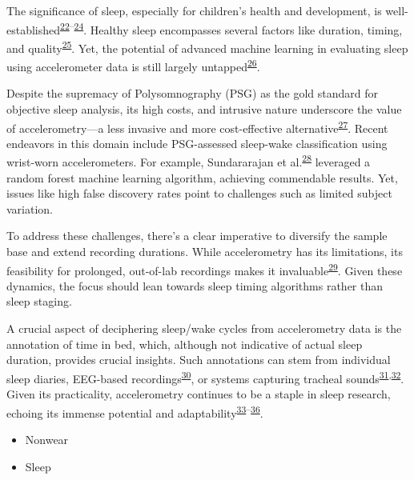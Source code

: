\documentclass[
  9pt,
]{article}
\providecommand{\tightlist}{%
  \setlength{\itemsep}{0pt}\setlength{\parskip}{0pt}}\usepackage{longtable,booktabs,array}
\begin{document}
The significance of sleep, especially for children's health and
development, is
well-established\textsuperscript{\protect\hyperlink{ref-chaput_systematic_2017}{22}--\protect\hyperlink{ref-st-onge_sleep_2016}{24}}.
Healthy sleep encompasses several factors like duration, timing, and
quality\textsuperscript{\protect\hyperlink{ref-gruber_position_2014}{25}}.
Yet, the potential of advanced machine learning in evaluating sleep
using accelerometer data is still largely
untapped\textsuperscript{\protect\hyperlink{ref-haghayegh_application_2020}{26}}.

Despite the supremacy of Polysomnography (PSG) as the gold standard for
objective sleep analysis, its high costs, and intrusive nature
underscore the value of accelerometry---a less invasive and more
cost-effective
alternative\textsuperscript{\protect\hyperlink{ref-vaughn_technical_2008}{27}}.
Recent endeavors in this domain include PSG-assessed sleep-wake
classification using wrist-worn accelerometers. For example,
Sundararajan et
al.\textsuperscript{\protect\hyperlink{ref-sundararajan_sleep_2021}{28}}
leveraged a random forest machine learning algorithm, achieving
commendable results. Yet, issues like high false discovery rates point
to challenges such as limited subject variation.

To address these challenges, there's a clear imperative to diversify the
sample base and extend recording durations. While accelerometry has its
limitations, its feasibility for prolonged, out-of-lab recordings makes
it
invaluable\textsuperscript{\protect\hyperlink{ref-van_de_water_objective_2011}{29}}.
Given these dynamics, the focus should lean towards sleep timing
algorithms rather than sleep staging.

A crucial aspect of deciphering sleep/wake cycles from accelerometry
data is the annotation of time in bed, which, although not indicative of
actual sleep duration, provides crucial insights. Such annotations can
stem from individual sleep diaries, EEG-based
recordings\textsuperscript{\protect\hyperlink{ref-younes_staging_2016}{30}},
or systems capturing tracheal
sounds\textsuperscript{\protect\hyperlink{ref-dafna_sleep-wake_2015}{31},\protect\hyperlink{ref-montazeri_ghahjaverestan_sleepwakefulness_2020}{32}}.
Given its practicality, accelerometry continues to be a staple in sleep
research, echoing its immense potential and
adaptability\textsuperscript{\protect\hyperlink{ref-hees_novel_2015}{33}--\protect\hyperlink{ref-barouni_ambulatory_2020}{36}}.

\begin{itemize}
\tightlist
\item
  Nonwear
\item
  Sleep
\end{itemize}
\end{document}
